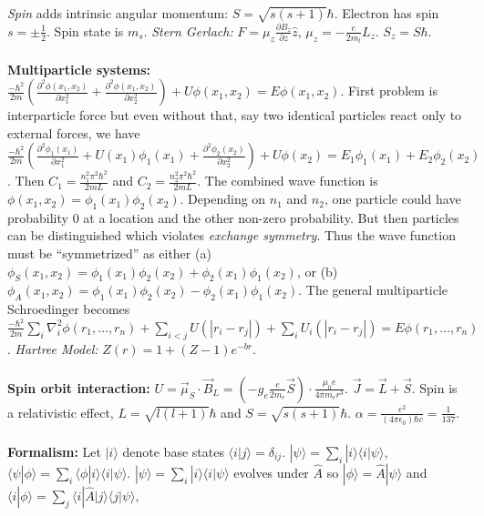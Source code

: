 \emph{Spin} adds intrinsic angular momentum: $S= \sqrt{s(s+1)} \hbar$.  Electron has spin
$s= \pm {\frac 1 2}$.  Spin state is $m_s$.  \emph{Stern Gerlach:}
$F= \mu_z {\frac {\partial B_z} {\partial z}} \hat{z}$, $\mu_z= -{\frac e {2m_l}} L_z$.
$S_z = S \hbar$. 
\\
\\
{\bf Multiparticle systems:}
${\frac {- \hbar^2} {2m}} ( {\frac {\partial^2 \phi(x_1, x_2)} {\partial x_1^2}}
+ {\frac {\partial^2 \phi(x_1, x_2)} {\partial x_2^2}}) + U\phi(x_1, x_2)= E \phi(x_1, x_2)$.
First problem is interparticle force but even without that, 
say two identical particles react only to external forces, we have
${\frac {- \hbar^2} {2m}} ( {\frac {\partial^2 \phi_1(x_1)} {\partial x_1^2}} + 
U(x_1) \phi_1(x_1)+ {\frac {\partial^2 \phi_2(x_2)} {\partial x_2^2}}) + 
U\phi(x_2)= E_1\phi_1(x_1)+ E_2 \phi_2(x_2)$.
Then $C_1= {\frac {n_1^2 \pi^2 \hbar^2} {2mL}}$ and
$C_2= {\frac {n_2^2 \pi^2 \hbar^2} {2mL}}$.  The combined wave function is
$\phi(x_1, x_2)= \phi_1(x_1) \phi_2(x_2)$.  Depending on $n_1$ and $n_2$, one particle
could have probability $0$ at a location and the other non-zero probability.  But then
particles can be distinguished which violates 
\emph{exchange symmetry}.  Thus the wave function must be
``symmetrized'' as either
(a)  $\phi_S(x_1 , x_2) = \phi_{1}(x_1) \phi_2(x_2) + \phi_2(x_1) \phi_1(x_2)$, or
(b)  $\phi_A(x_1 , x_2) = \phi_{1}(x_1) \phi_2(x_2) - \phi_2(x_1) \phi_1(x_2)$.
The general multiparticle Schroedinger becomes
${\frac {- \hbar^2} {2m}} \sum_i \nabla_i^2 \phi(r_1, \ldots, r_n) +
\sum_{i<j} U(|r_i - r_j|) +
\sum_{i} U_i(|r_i - r_j|) = E \phi(r_1 , \ldots , r_n)$.  \emph{Hartree Model:}
$Z(r)= 1 + (Z-1) e^{-br}$.
\\
\\
{\bf Spin orbit interaction:} $U= {\vec {\mu}}_S \cdot {\vec B}_L =
(-g_e {\frac {e} {2 m_e}} {\vec S}) \cdot {\frac {\mu_0 e} {4 \pi m_e r^3}}$.
${\vec J}= {\vec L} + {\vec S}$.  Spin is a relativistic effect,
$L= \sqrt{l(l+1)} \hbar$ and
$S= \sqrt{s(s+1)} \hbar$.  $\alpha = {\frac {e^2} {(4 \pi \epsilon_0) \hbar c}} = {\frac 1 {137}}$.
\\
\\
{\bf Formalism:}
Let $|i \rangle $ denote base states $ \langle i|j \rangle = \delta_{ij}$.
$|\psi \rangle  = \sum_i |i \rangle  \langle i | \psi \rangle $,
$\langle \psi | \phi \rangle  = \sum_i  \langle \phi|i \rangle   \langle i | \psi \rangle $.
$| \psi \rangle  = \sum_i |i \rangle   \langle i|\psi \rangle $ evolves under $\hat {A}$ so
$|\phi \rangle  = \hat{A} |\psi \rangle $ and $ \langle i | \phi \rangle  = \sum_j  \langle i| \hat{A} | j \rangle   \langle j| \psi \rangle $,

